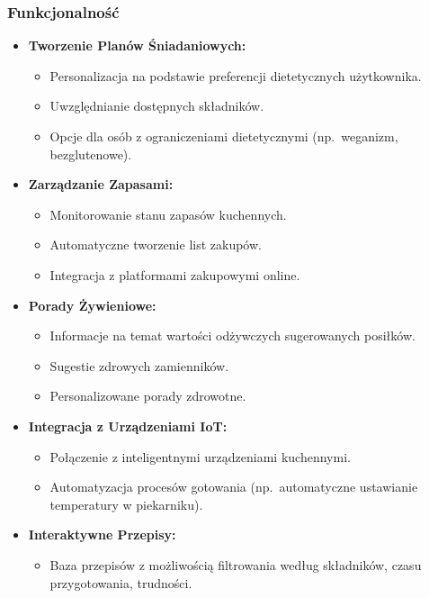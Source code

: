 \documentclass[a4paper,12pt]{article}
\begin{document}
    \subsubsection{Funkcjonalność}
    \begin{itemize}
        \item \textbf{Tworzenie Planów Śniadaniowych:}
        \begin{itemize}
            \item Personalizacja na podstawie preferencji dietetycznych użytkownika.
            \item Uwzględnianie dostępnych składników.
            \item Opcje dla osób z ograniczeniami dietetycznymi (np.\ weganizm, bezglutenowe).
        \end{itemize}
        \item \textbf{Zarządzanie Zapasami:}
        \begin{itemize}
            \item Monitorowanie stanu zapasów kuchennych.
            \item Automatyczne tworzenie list zakupów.
            \item Integracja z platformami zakupowymi online.
        \end{itemize}
        \item \textbf{Porady Żywieniowe:}
        \begin{itemize}
            \item Informacje na temat wartości odżywczych sugerowanych posiłków.
            \item Sugestie zdrowych zamienników.
            \item Personalizowane porady zdrowotne.
        \end{itemize}
        \item \textbf{Integracja z Urządzeniami IoT:}
        \begin{itemize}
            \item Połączenie z inteligentnymi urządzeniami kuchennymi.
            \item Automatyzacja procesów gotowania (np.\ automatyczne ustawianie temperatury w piekarniku).
        \end{itemize}
        \item \textbf{Interaktywne Przepisy:}
        \begin{itemize}
            \item Baza przepisów z możliwością filtrowania według składników, czasu przygotowania, trudności.

\end{itemize}
\end{itemize}
\end{document}
